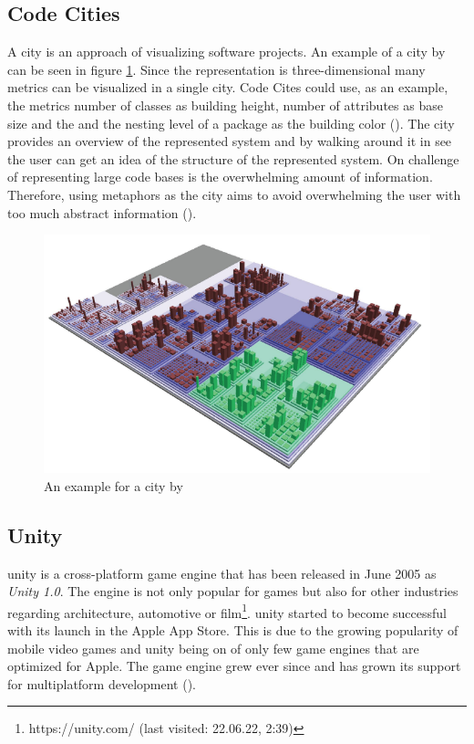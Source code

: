 \subsection{Code Cities}
\label{sec:code_cities}
A \gls{city} is an approach of visualizing software projects.
An example of a \gls{city} by \cite{wettel2007visualizing} can be seen in figure \ref{fig:city_example}.
Since the representation is three-dimensional many metrics can be visualized in a single \gls{city}.
Code Cites could use, as an example, the metrics number of classes as building height, number of attributes as base size and the and the nesting level of a package as the building color (\cite{wettel2008visual}).
The \gls{city} provides an overview of the represented system and by walking around it in \gls{see} the user can get an idea of the structure of the represented system.
On challenge of representing large code bases is the overwhelming amount of information.
Therefore, using metaphors as the \gls{city} aims to avoid overwhelming the user with too much abstract information (\cite{Wettel2008}).
\begin{figure}[htb]
    \centering
    \includegraphics[width=1\textwidth]{Fundamentals/img/code_city.png}
    \caption{An example for a \gls{city} by \cite{wettel2007visualizing}}
    \label{fig:city_example}
\end{figure}

\subsection{Unity}
\gls{unity} is a cross-platform game engine that has been released in June 2005 as \textit{Unity 1.0}.
The engine is not only popular for games but also for other industries regarding architecture, automotive or film\footnote{https://unity.com/ (last visited: 22.06.22, 2:39)}.
\gls{unity} started to become successful with its launch in the Apple App Store. 
This is due to the growing popularity of mobile video games and \gls{unity} being on of only few game engines that are optimized for Apple.
The game engine grew ever since and has grown its support for multiplatform development (\cite{nicoll2019unity}).

